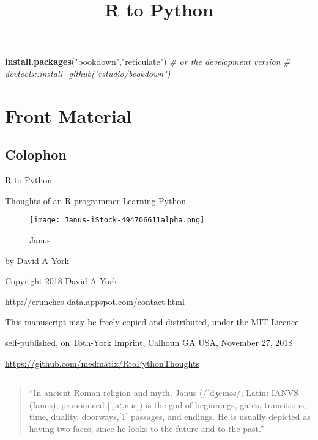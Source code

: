 \documentclass[]{book}
\title{R to Python}
\author{}
\date{}
\newenvironment{Shaded}{\begin{snugshade}}{\end{snugshade}}
\newcommand{\KeywordTok}[1]{\textcolor[rgb]{0.13,0.29,0.53}{\textbf{#1}}}
\newcommand{\StringTok}[1]{\textcolor[rgb]{0.31,0.60,0.02}{#1}}
\newcommand{\CommentTok}[1]{\textcolor[rgb]{0.56,0.35,0.01}{\textit{#1}}}
\newcommand{\NormalTok}[1]{#1}
\theoremstyle{definition}
\theoremstyle{definition}
\theoremstyle{definition}
\theoremstyle{remark}
\begin{document}
\maketitle

{
\setcounter{tocdepth}{1}
\tableofcontents
}
\begin{Shaded}
\begin{Highlighting}[]
\KeywordTok{install.packages}\NormalTok{(}\StringTok{"bookdown"}\NormalTok{,}\StringTok{"reticulate"}\NormalTok{)}
\CommentTok{# or the development version}
\CommentTok{# devtools::install_github("rstudio/bookdown")}
\end{Highlighting}
\end{Shaded}

\chapter{Front Material}\label{front-material}

\section{Colophon}\label{colophon}

R to Python

Thoughts of an R programmer Learning Python

\begin{figure}
\centering
\texttt{[image: Janus-iStock-494706611alpha.png]}
\caption{Janus}
\end{figure}

by David A York

Copyright 2018 David A York

\url{http://crunches-data.appspot.com/contact.html}

This manuscript may be freely copied and distributed, under the MIT
Licence

self-published, on Toth-York Imprint, Calhoun GA USA, November 27, 2018

\url{https://github.com/medmatix/RtoPythonThoughts}

\begin{center}\rule{0.5\linewidth}{\linethickness}\end{center}

\begin{quote}
``In ancient Roman religion and myth, Janus (/ˈdʒeɪnəs/; Latin: IANVS
(Iānus), pronounced {[}ˈjaː.nus{]}) is the god of beginnings, gates,
transitions, time, duality, doorways,{[}1{]} passages, and endings. He
is usually depicted as having two faces, since he looks to the future
and to the past.''
\end{quote}
\end{document}

